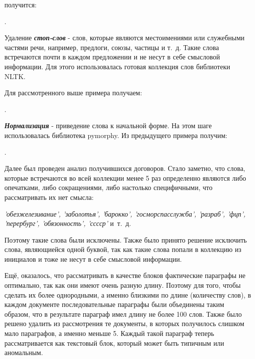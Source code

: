 \documentclass[14pt]{matmex-diploma-custom}
\begin{document}
\vspace{13pt}
\noindent получится:

\vspace{13pt}
.

\vspace{13pt}

Удаление \textbf{\textit{стоп-слов}} - слов, которые являются местоимениями или служебными частями речи, например, предлоги, союзы, частицы и т.~д. Такие слова встречаются почти в каждом предложении и не несут в себе смысловой информации. Для этого использовалась готовая коллекция слов библиотеки NLTK. 

Для рассмотренного выше примера получаем:

\vspace{13pt}
.
\vspace{13pt}

\textbf{\textit{Нормализация}} - приведение слова к начальной форме. На этом шаге использовалась библиотека pymorphy. Из предыдущего примера получим:

\vspace{13pt}
.
\vspace{13pt}

Далее был проведен анализ получившихся договоров. Стало заметно, что слова, которые встречаются во всей коллекции менее 5 раз определенно являются либо опечатками, либо сокращениями, либо настолько специфичными, что рассматривать их нет смысла: 

\vspace{10pt}
\noindent\textit{'обезжелезивание', 'заболотья', 'барокко', 'госморспасслужба', \linebreak 'разраб', 'фцп', 'перербург', 'обязонность', 'сссср'} и~т.~д.
\vspace{10pt}

Поэтому такие слова были исключены. Также было принято решение исключить слова, являющиейся одной буквой, так как такие слова попали в коллекцию из инициалов и тоже не несут в себе смысловой информации.

Ещё, оказалось, что рассматривать в качестве блоков фактические параграфы не оптимально, так как они имеют очень разную длину. Поэтому для того, чтобы сделать их более однородными, а именно близкими по длине (количеству слов), в каждом документе последовательные параграфы были объединены таким образом, что в результате параграф имел длину не более 100 слов. Также было решено удалить из рассмотрения те документы, в которых получилось слишком мало параграфов, а именно меньше 5. Каждый такой параграф теперь рассматривается как текстовый блок, который может быть типичным или аномальным. 
\end{document}
